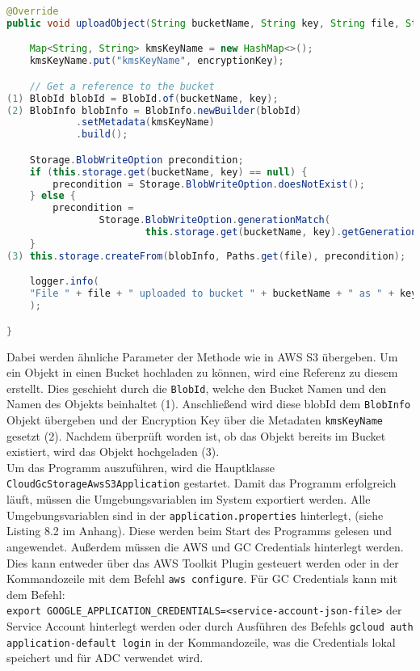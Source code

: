 \begin{lstlisting}[language=Java, caption=Prototyp Code Snippet - Hochladen eines Objekts nach Cloud Storage]
@Override
public void uploadObject(String bucketName, String key, String file, String encryptionKey, String storageClass) throws IOException {

    Map<String, String> kmsKeyName = new HashMap<>();
    kmsKeyName.put("kmsKeyName", encryptionKey);

    // Get a reference to the bucket
(1) BlobId blobId = BlobId.of(bucketName, key);
(2) BlobInfo blobInfo = BlobInfo.newBuilder(blobId)
            .setMetadata(kmsKeyName)
            .build();

    Storage.BlobWriteOption precondition;
    if (this.storage.get(bucketName, key) == null) {
        precondition = Storage.BlobWriteOption.doesNotExist();
    } else {
        precondition =
                Storage.BlobWriteOption.generationMatch(
                        this.storage.get(bucketName, key).getGeneration());
    }
(3) this.storage.createFrom(blobInfo, Paths.get(file), precondition);

    logger.info(
    "File " + file + " uploaded to bucket " + bucketName + " as " + key
    );

}
\end{lstlisting}

Dabei werden ähnliche Parameter der Methode wie in AWS S3 übergeben. Um ein Objekt in einen Bucket hochladen zu können, wird eine Referenz zu diesem erstellt. Dies geschieht durch die \verb|BlobId|, welche den Bucket Namen und den Namen des Objekts beinhaltet (1). 
Anschließend wird diese blobId dem \verb|BlobInfo| Objekt übergeben und der Encryption Key über die Metadaten \verb|kmsKeyName| gesetzt (2). Nachdem überprüft worden ist, ob das Objekt bereits im Bucket existiert, wird das Objekt hochgeladen (3).\\

Um das Programm auszuführen, wird die Hauptklasse \verb|CloudGcStorageAwsS3Application| gestartet. Damit das Programm erfolgreich läuft, müssen die Umgebungsvariablen im System exportiert werden. Alle Umgebungsvariablen sind in der \verb|application.properties| hinterlegt, (siehe Listing 8.2 im Anhang). Diese werden beim Start des Programms gelesen und angewendet. Außerdem müssen die AWS und GC Credentials hinterlegt werden. Dies kann entweder über das AWS Toolkit Plugin gesteuert werden oder in der Kommandozeile mit dem Befehl \verb|aws configure|. Für GC Credentials kann mit dem Befehl:\\ \verb|export GOOGLE_APPLICATION_CREDENTIALS=<service-account-json-file>| der Service Account hinterlegt werden oder durch Ausführen des Befehls \verb|gcloud auth application-default login| in der Kommandozeile, was die Credentials lokal speichert und für ADC verwendet wird.


